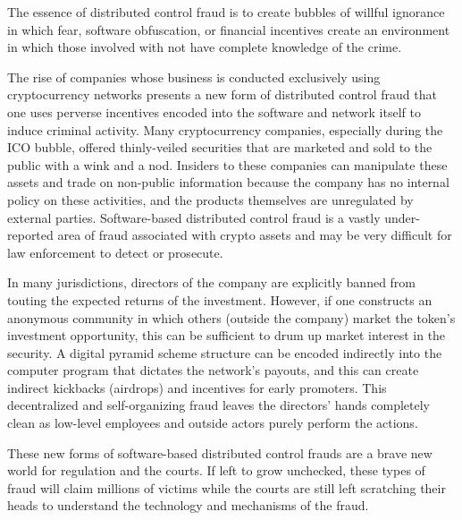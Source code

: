 The essence of distributed control fraud is to create bubbles of willful
ignorance in which fear, software obfuscation, or financial incentives create an
environment in which those involved with not have complete knowledge of the
crime. \cite{black_best_2013}

The rise of companies whose business is conducted exclusively using
cryptocurrency networks presents a new form of distributed control fraud that
one uses perverse incentives encoded into the software and network itself to
induce criminal activity. Many cryptocurrency companies, especially during the
ICO bubble, offered thinly-veiled securities that are marketed and sold to the
public with a wink and a nod. Insiders to these companies can manipulate these
assets and trade on non-public information because the company has no internal
policy on these activities, and the products themselves are unregulated by
external parties. Software-based distributed control fraud is a vastly
under-reported area of fraud associated with crypto assets and may be very
difficult for law enforcement to detect or prosecute.

In many jurisdictions, directors of the company are explicitly banned from
touting the expected returns of the investment. However, if one constructs an
anonymous community in which others (outside the company) market the token's
investment opportunity, this can be sufficient to drum up market interest in the
security. A digital pyramid scheme structure can be encoded indirectly into the
computer program that dictates the network's payouts, and this can create
indirect kickbacks (airdrops) and incentives for early promoters. This
decentralized and self-organizing fraud leaves the directors' hands completely
clean as low-level employees and outside actors purely perform the actions.

These new forms of software-based distributed control frauds are a brave new
world for regulation and the courts. If left to grow unchecked, these types of
fraud will claim millions of victims while the courts are still left scratching
their heads to understand the technology and mechanisms of the fraud.
\cite{saengchote_defi_2021, zetzsche_ico_2017}
